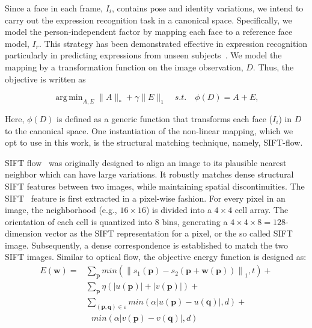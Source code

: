 \documentclass[journal]{IEEEtran}
\DeclareMathOperator*{\argmin}{arg\,min}
\begin{document}
Since a face in each frame, $I_i$, contains pose and identity variations, we intend to carry out the expression recognition task in a canonical space. Specifically, we model the person-independent factor by mapping each face to a reference face model, $I_r$. This strategy has been demonstrated effective in expression recognition particularly in predicting expressions from unseen subjects~\cite{Yang_SMCB12,Dahmane_TMM14}. We model the mapping by a transformation function on the image observation, $D$. Thus, the objective is written as

\begin{equation} \label{eq:rpca}
\argmin_{A,E} \|A\|_*+\gamma \|E\|_1  \quad s.t. \quad \phi (D) = A + E, 
\end{equation}

Here, $\phi (D)$ is defined as a generic function that transforms each face ($I_i$) in $D$ to the canonical space. One instantiation of the non-linear mapping, which we opt to use in this work, is the structural matching technique, namely, SIFT-flow. 

SIFT flow~\cite{Liu_PAMI11} was originally designed to align an image to its plausible nearest neighbor which can have large variations. It robustly matches dense structural SIFT features between two images, while maintaining spatial discontinuities. The SIFT~\cite{Lowe_ICCV99} feature is first extracted in a pixel-wise fashion. For every pixel in an image, the neighborhood (e.g., $16\times16$) is divided into a $4\times4$ cell array. The orientation of each cell is quantized into 8 bins, generating a $4\times4\times8=128$-dimension vector as the SIFT representation for a pixel, or the so called SIFT image. Subsequently, a dense correspondence is established to match the two SIFT images. Similar to optical flow, the objective energy function is designed as:
\begin{align}
	\label{data_term}
	E(\textbf{w})=&\sum_\textbf{p} min(\left\|s_1 (\textbf{p})-s_2 (\textbf{p}+\textbf{w}(\textbf{p}))\right\|_1 ,t)+
\\\label{small_constraint}
&\sum_\textbf{p} \eta(\left|u(\textbf{p})\right|+\left|v(\textbf{p})\right|) +
\\\nonumber
&\sum_{(\textbf{p},\textbf{q})\in\varepsilon} min(\alpha\left|u(\textbf{p})-u(\textbf{q})\right|,d)+
\\\label{smooth_constraint}
&~~~min(\alpha\left|v(\textbf{p})-v(\textbf{q})\right|,d)
\end{align}
\end{document}
